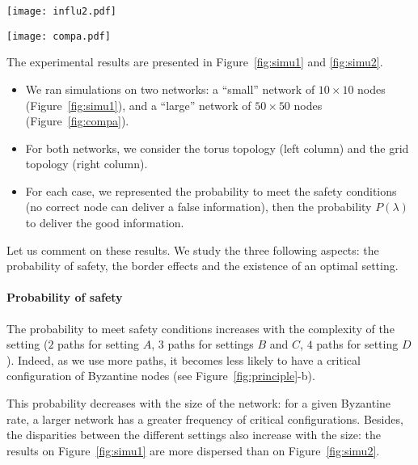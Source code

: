 \documentclass[a4paper,11pt]{article}
\begin{document}
\begin{figure*}
\begin{center}
\texttt{[image: influ2.pdf]}
\caption{Simulation results on a $50 \times 50$ network} 
\label{fig:simu2}
\end{center}
\end{figure*}

\begin{figure*}
\begin{center}
\texttt{[image: compa.pdf]}
\caption{Experimental comparison of existing protocols on a logarithmic scale} 
\label{fig:compa}
\end{center}
\end{figure*}

The experimental results are presented in Figure~\ref{fig:simu1} and \ref{fig:simu2}. 
\begin{itemize}
\item We ran simulations on two networks: a ``small'' network of $10 \times 10$ nodes (Figure~\ref{fig:simu1}), and a ``large'' network of $50 \times 50$ nodes (Figure~\ref{fig:compa}).
\item For both networks, we consider the torus topology (left column) and the grid topology (right column).
\item For each case, we represented the probability to meet the safety conditions (no correct node can deliver a false information), then the probability $P(\lambda)$ to deliver the good information.
\end{itemize}


Let us comment on these results. We study the three following aspects: the probability of safety, the border effects and the existence of an optimal setting.

\paragraph{Probability of safety}

The probability to meet safety conditions increases with the complexity of the setting ($2$ paths for setting $A$, $3$ paths for settings $B$ and $C$, $4$ paths for setting $D$). Indeed, as we use more paths, it becomes less likely to have a critical configuration of Byzantine nodes (see Figure~\ref{fig:principle}-b).

This probability decreases with the size of the network: for a given Byzantine rate, a larger network has a greater frequency of critical configurations. Besides, the disparities between the different settings also increase with the size: the results on Figure~\ref{fig:simu1} are more dispersed than on Figure~\ref{fig:simu2}.
\end{document}

